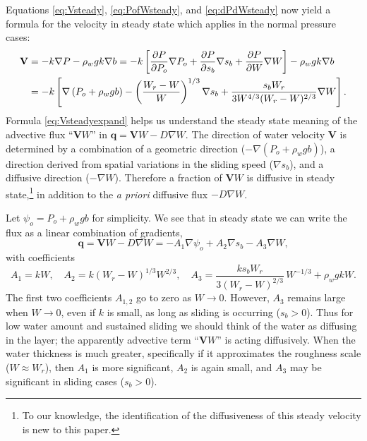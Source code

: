 \documentclass[11pt,final]{amsart}
\newcommand\bV{\mathbf{V}}
\newcommand\bq{\mathbf{q}}
\newcommand{\grad}{\nabla}
\begin{document}
Equations \eqref{eq:Vsteady}, \eqref{eq:PofWsteady}, and \eqref{eq:dPdWsteady} now yield a formula for the velocity in steady state which applies in the normal pressure cases:
\begin{align}
\bV &= - k \grad P - \rho_w g k \grad b = - k \left[\frac{\partial P}{\partial P_o} \grad P_o + \frac{\partial P}{\partial s_b} \grad s_b + \frac{\partial P}{\partial W} \grad W\right] - \rho_w g k \grad b  \notag \\
    &= - k \left[\grad \left(P_o + \rho_w g b\right) - \left(\frac{W_r - W}{W}\right)^{1/3} \grad s_b + \frac{s_b W_r}{3 W^{4/3} (W_r - W)^{2/3}} \grad W\right]. \label{eq:Vsteadyexpand}
\end{align}
Formula \eqref{eq:Vsteadyexpand} helps us understand the steady state meaning of the advective flux ``$\bV W$'' in $\bq=\bV W - D \grad W$.  The direction of water velocity $\bV$ is determined by a combination of a geometric direction ($-\grad \left(P_o + \rho_w g b\right)$), a direction derived from spatial variations in the sliding speed ($\grad s_b$), and a diffusive direction ($-\grad W$).  Therefore a fraction of $\bV W$ is diffusive in steady state,\footnote{To our knowledge, the identification of the diffusiveness of this steady velocity is new to this paper.} in addition to the \emph{a priori} diffusive flux $- D \grad W$.

Let $\psi_o = P_o + \rho_w g b$ for simplicity.  We see that in steady state we can write the flux as a linear combination of gradients,
\begin{equation}
\bq = \bV W - D \grad W = - A_1 \grad \psi_o + A_2 \grad s_b - A_3 \grad W,  \label{eq:qabstract}
\end{equation}
with coefficients
\begin{equation}
A_1 = k W, \quad
A_2 = k \left(W_r - W\right)^{1/3} W^{2/3}, \quad
A_3 = \frac{k s_b W_r}{3 (W_r - W)^{2/3}}\, W^{-1/3} + \rho_w g k W.
\end{equation}
The first two coefficients $A_{1,2}$ go to zero as $W\to 0$.  However, $A_3$ remains large when $W\to 0$, even if $k$ is small, as long as sliding is occurring ($s_b > 0$).  Thus for low water amount and sustained sliding we should think of the water as diffusing in the layer; the apparently advective term ``$\bV W$'' is acting diffusively.  When the water thickness is much greater, specifically if it approximates the roughness scale ($W\approx W_r$), then $A_1$ is more significant, $A_2$ is again small, and $A_3$ may be significant in sliding cases ($s_b>0$).
\end{document}
